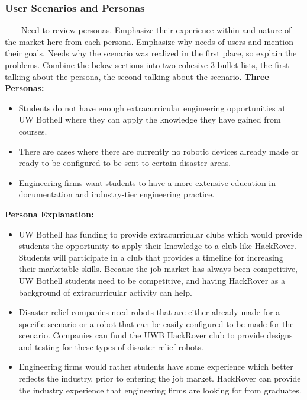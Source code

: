 \documentclass[a4paper, 10pt]{article}
\begin{document}
		\subsubsection{User Scenarios and Personas}
		------Need to review personas. Emphasize their experience within and nature of the market here from each persona. Emphasize why needs of users and mention their goals. Needs why the scenario was realized in the first place, so explain the problems. Combine the below sections into two cohesive 3 bullet lists, the first talking about the persona, the second talking about the scenario.
		\textbf{Three Personas:}
		
		\begin{itemize}
			\item
			Students do not have enough extracurricular engineering opportunities at UW Bothell where they can apply the knowledge they have gained from courses.
			
			\item
			There are cases where there are currently no robotic devices already made or ready to be configured to be sent to certain disaster areas.
			
			\item
			Engineering firms want students to have a more extensive education in documentation and industry-tier engineering practice.
		\end{itemize}
		
		\textbf{Persona Explanation:}

		\begin{itemize}
			\item
			UW Bothell has funding to provide extracurricular clubs which would provide students the opportunity to apply their knowledge to a club like HackRover. Students will participate in a club that provides a timeline for increasing their marketable skills. Because the job market has always been competitive, UW Bothell students need to be competitive, and having HackRover as a background of extracurricular activity can help.

			\item
			Disaster relief companies need robots that are either already made for a specific scenario or a robot that can be easily configured to be made for the scenario. Companies can fund the UWB HackRover club to provide designs and testing for these types of disaster-relief robots.

			\item
			Engineering firms would rather students have some experience which better reflects the industry, prior to entering the job market. HackRover can provide the industry experience that engineering firms are looking for from graduates. 
		\end{itemize}
\end{document}
